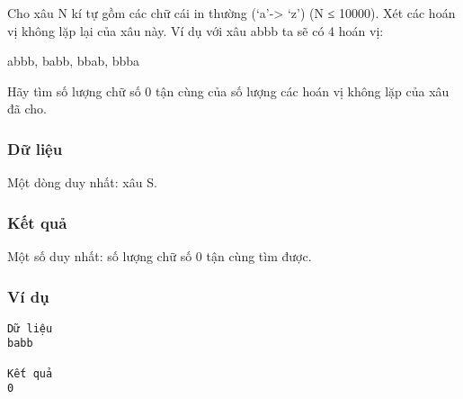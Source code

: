 



   Cho xâu N kí tự gồm các chữ cái in thường (‘a’-> ‘z’) (N   ≤ 10000). Xét các hoán vị không lặp lại của xâu này. Ví   dụ với xâu abbb ta sẽ có 4 hoán vị:  

   abbb, babb, bbab, bbba  

   Hãy tìm số lượng chữ số 0 tận cùng của số lượng các   hoán vị không lặp của xâu đã cho.  

\subsubsection{   Dữ liệu  }

   Một dòng duy nhất: xâu S.  

\subsubsection{   Kết quả  }

   Một số duy nhất: số lượng chữ số 0 tận cùng tìm   được.  

\subsubsection{   Ví dụ  }
\begin{verbatim}
Dữ liệu
babb

Kết quả
0
\end{verbatim}
